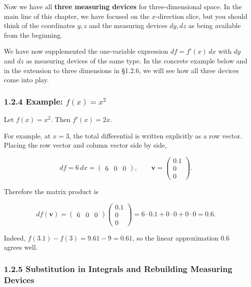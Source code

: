 \documentclass[a4paper,12pt,openany]{book}
\begin{document}
Now we have all \textbf{three measuring devices} for three-dimensional
space. In the main line of this chapter, we have focused on the
\(x\)-direction slice, but you should think of the coordinates \(y,z\)
and the measuring devices \(dy,dz\) as being available from the
beginning.

We have now supplemented the one-variable expression \(df=f'(x)\,dx\)
with \(dy\) and \(dz\) as measuring devices of the same type. In the
concrete example below and in the extension to three dimensions in
§1.2.6, we will see how all three devices come into play.

\hypertarget{example-fxx2}{%
\subsubsection{\texorpdfstring{1.2.4 Example:
\(f(x)=x^2\)}{1.2.4 Example: f(x)=x\^{}2}}\label{example-fxx2}}

Let \(f(x)=x^2\). Then \(f'(x)=2x\).

For example, at \(x=3\), the total differential is written explicitly as
a row vector. Placing the row vector and column vector side by side,

\[
df=6\,dx=\begin{pmatrix}6&0&0\end{pmatrix},\qquad
\mathbf{v}=\begin{pmatrix}0.1\\0\\0\end{pmatrix}.
\]

Therefore the matrix product is

\[
df(\mathbf{v})=
\begin{pmatrix}6&0&0\end{pmatrix}
\begin{pmatrix}0.1\\0\\0\end{pmatrix}
=6\cdot0.1+0\cdot0+0\cdot0=0.6.
\]

Indeed, \(f(3.1)-f(3)=9.61-9=0.61\), so the linear approximation \(0.6\)
agrees well.

\hypertarget{substitution-in-integrals-and-rebuilding-measuring-devices}{%
\subsubsection{1.2.5 Substitution in Integrals and Rebuilding Measuring
Devices}\label{substitution-in-integrals-and-rebuilding-measuring-devices}}
\end{document}
